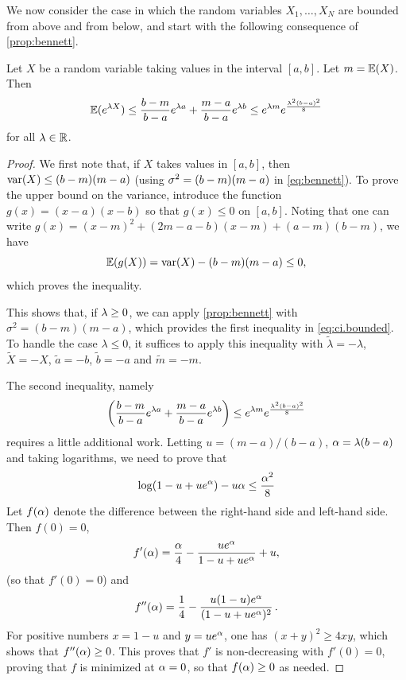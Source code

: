 We now consider the case in which the random variables $X_1, \ldots, X_N$ are bounded from above and from below,  and start with the following consequence of  \cref{prop:bennett}.
\begin{proposition}
\label{prop:ci.bounded}
Let $X$ be a random variable taking values in the interval $[a,b]$. Let $m=\bm{\mathbb E}(X)$. Then
\begin{equation}
\label{eq:ci.bounded}
\bm{\mathbb E}(e^{\lambda X}) \leq \frac{b-m}{b-a}e^{\lambda a} + \frac{m-a}{b-a}e^{\lambda b} \leq e^{\lambda m} e^{\frac{\lambda^2(b-a)^2}8}
\end{equation}
for all $\lambda\in{\mathbb{R}}$.
\end{proposition}
\begin{proof}
We first note that, if $X$ takes values in $[a,b]$, then
$\mathrm{var}(X) \leq (b-m)(m-a)$ (using $\sigma^2 = (b-m)(m-a)$ in \cref{eq:bennett}). To prove the upper bound on the variance, introduce the function $g(x) = (x-a)(x-b)$ so that $g(x) \leq 0$ on $[a,b]$. Noting that one can write $g(x) = (x-m)^2 + (2m-a-b)(x-m) + (a-m)(b-m)$, we have
\[
\bm{\mathbb E}(g(X)) = \mathrm{var}(X) - (b-m)(m-a) \leq 0,
\]
which proves the inequality.

This shows that, if $\lambda\geq 0$, we can apply  \cref{prop:bennett} with $\sigma^2 = (b-m)(m-a)$, which provides the first inequality in \cref{eq:ci.bounded}. To handle the case $\lambda  \leq 0$, it suffices to apply this inequality with $\tilde \lambda = -\lambda$, $\tilde X = -X$, $\tilde a=-b$, $\tilde b = -a$ and $\tilde m = -m$.

The second inequality, namely 
\[
\left(\frac{b-m}{b-a}e^{\lambda a} + \frac{m-a}{b-a}e^{\lambda b}\right) \leq e^{\lambda m} e^{\frac{\lambda^2(b-a)^2}8}
\]
requires a little additional work. Letting $u = (m-a)/(b-a)$, $\alpha = \lambda (b-a)$ and taking logarithms, we need to prove that
\[
\log(1 -u + u e^\alpha)  - u\alpha \leq \frac{\alpha^2}8
\]
Let $f(\alpha)$ denote the difference between the right-hand side and  left-hand side. Then $f(0) =  0$,
\[
f'(\alpha) = \frac{\alpha}4 - \frac{ue^\alpha }{1 - u +ue^\alpha} + u,
\]
(so that $f'(0) = 0$) and
\[
f''(\alpha) = \frac14 - \frac{u(1-u)e^\alpha}{(1 - u + ue^\alpha)^2}\,.
\]
For positive numbers $x=1-u$ and $y = ue^\alpha$, one has $(x+y)^2 \geq 4xy$, which shows that $f''(\alpha) \geq 0$. This proves that $f'$ is non-decreasing with $f'(0) = 0$, proving that $f$ is minimized at $\alpha=0$, so that $f(\alpha) \geq 0$ as needed. 
\end{proof}

